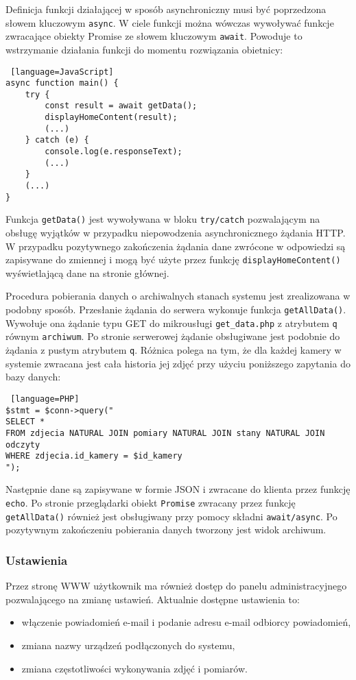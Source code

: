 \documentclass[a4paper,11pt,twoside]{article}
\begin{document}
Definicja funkcji działającej w sposób asynchroniczny musi być poprzedzona słowem kluczowym \texttt{async}. W ciele funkcji można wówczas wywoływać funkcje zwracające obiekty Promise ze słowem kluczowym \texttt{await}. Powoduje to wstrzymanie działania funkcji do momentu rozwiązania obietnicy:
\begin{lstlisting} [language=JavaScript]
async function main() {
    try {
        const result = await getData();
        displayHomeContent(result);
        (...)
    } catch (e) {
        console.log(e.responseText);
        (...)
    }
	(...)
}
\end{lstlisting}
Funkcja \texttt{getData()} jest wywoływana w bloku \texttt{try/catch} pozwalającym na obsługę wyjątków w przypadku niepowodzenia asynchronicznego żądania HTTP. W przypadku pozytywnego zakończenia żądania dane zwrócone w odpowiedzi są zapisywane do zmiennej i mogą być użyte przez funkcję \texttt{displayHomeContent()} wyświetlającą dane na stronie głównej.

Procedura pobierania danych o archiwalnych stanach systemu jest zrealizowana w podobny sposób. Przesłanie żądania do serwera wykonuje funkcja \texttt{getAllData()}. Wywołuje ona żądanie typu GET do mikrousługi \texttt{get{\_}data.php} z atrybutem \texttt{q} równym \texttt{archiwum}. Po stronie serwerowej żądanie obsługiwane jest podobnie do żądania z pustym atrybutem \texttt{q}. Różnica polega na tym, że dla każdej kamery w systemie zwracana jest cała historia jej zdjęć przy użyciu poniższego zapytania do bazy danych:
\begin{lstlisting} [language=PHP]
$stmt = $conn->query("
SELECT *
FROM zdjecia NATURAL JOIN pomiary NATURAL JOIN stany NATURAL JOIN odczyty
WHERE zdjecia.id_kamery = $id_kamery
");
\end{lstlisting}
Następnie dane są zapisywane w formie JSON i zwracane do klienta przez funkcję \texttt{echo}. Po stronie przeglądarki obiekt \texttt{Promise} zwracany przez funkcję \texttt{getAllData()} również jest obsługiwany przy pomocy składni \texttt{await/async}. Po pozytywnym zakończeniu pobierania danych tworzony jest widok archiwum.

\subsubsection{Ustawienia}
Przez stronę WWW użytkownik ma również dostęp do panelu administracyjnego pozwalającego na zmianę ustawień. Aktualnie dostępne ustawienia to:
\begin{itemize}
\item włączenie powiadomień e-mail i podanie adresu e-mail odbiorcy powiadomień,
\item zmiana nazwy urządzeń podłączonych do systemu,
\item zmiana częstotliwości wykonywania zdjęć i pomiarów.
\end{itemize}
\end{document}
